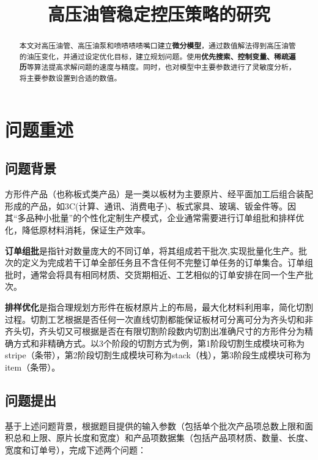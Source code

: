 \documentclass[bwprint]{gmcmthesis}
\title{高压油管稳定控压策略的研究}
\begin{document}
 \maketitle

\begin{abstract}
本文对高压油管、高压油泵和喷啧啧啧嘴口建立\textbf{微分模型}，通过数值解法得到高压油管的油压变化，并通过设定优化目标，建立规划问题。使用\textbf{优先搜索、控制变量、稀疏遍历}等算法提高求解问题的速度与精度。同时，也对模型中主要参数进行了灵敏度分析，将主要参数设置到合适的数值。
\end{abstract}


\section{问题重述}
\subsection{问题背景}

方形件产品（也称板式类产品）是一类以板材为主要原片、经平面加工后组合装配形成的产品，如3C(计算、通讯、消费电子)、板式家具、玻璃、钣金件等。因其“多品种小批量”的个性化定制生产模式，企业通常需要进行订单组批和排样优化，降低原材料消耗，保证生产效率。

\textbf{订单组批}是指针对数量庞大的不同订单，将其组成若干批次,实现批量化生产。批次的定义为完成若干订单全部任务且不含任何不完整订单任务的订单集合。订单组批时，通常会将具有相同材质、交货期相近、工艺相似的订单安排在同一个生产批次。

\textbf{排样优化}是指合理规划方形件在板材原片上的布局，最大化材料利用率，简化切割过程。切割工艺根据是否任何一次直线切割都能保证板材可分离可分为齐头切和非齐头切，齐头切又可根据是否在有限切割阶段数内切割出准确尺寸的方形件分为精确方式和非精确方式。以3个阶段的切割方式为例，第1阶段切割生成模块可称为stripe（条带），第2阶段切割生成模块可称为stack（栈），第3阶段生成模块可称为item（条带）。

\quad
\subsection{问题提出}
基于上述问题背景，根据题目提供的输入参数（包括单个批次产品项总数上限和面积总和上限、原片长度和宽度）和产品项数据集（包括产品项材质、数量、长度、宽度和订单号），完成下述两个问题：
\end{document}
